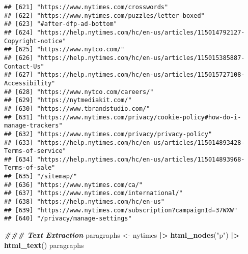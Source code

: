 \documentclass[
]{article}
\newenvironment{Shaded}{\begin{snugshade}}{\end{snugshade}}
\newcommand{\DocumentationTok}[1]{\textcolor[rgb]{0.56,0.35,0.01}{\textbf{\textit{#1}}}}
\newcommand{\FunctionTok}[1]{\textcolor[rgb]{0.13,0.29,0.53}{\textbf{#1}}}
\newcommand{\NormalTok}[1]{#1}
\newcommand{\OtherTok}[1]{\textcolor[rgb]{0.56,0.35,0.01}{#1}}
\newcommand{\SpecialCharTok}[1]{\textcolor[rgb]{0.81,0.36,0.00}{\textbf{#1}}}
\newcommand{\StringTok}[1]{\textcolor[rgb]{0.31,0.60,0.02}{#1}}
\begin{document}
\begin{verbatim}
## [621] "https://www.nytimes.com/crosswords"                                                                        
## [622] "https://www.nytimes.com/puzzles/letter-boxed"                                                              
## [623] "#after-dfp-ad-bottom"                                                                                      
## [624] "https://help.nytimes.com/hc/en-us/articles/115014792127-Copyright-notice"                                  
## [625] "https://www.nytco.com/"                                                                                    
## [626] "https://help.nytimes.com/hc/en-us/articles/115015385887-Contact-Us"                                        
## [627] "https://help.nytimes.com/hc/en-us/articles/115015727108-Accessibility"                                     
## [628] "https://www.nytco.com/careers/"                                                                            
## [629] "https://nytmediakit.com/"                                                                                  
## [630] "https://www.tbrandstudio.com/"                                                                             
## [631] "https://www.nytimes.com/privacy/cookie-policy#how-do-i-manage-trackers"                                    
## [632] "https://www.nytimes.com/privacy/privacy-policy"                                                            
## [633] "https://help.nytimes.com/hc/en-us/articles/115014893428-Terms-of-service"                                  
## [634] "https://help.nytimes.com/hc/en-us/articles/115014893968-Terms-of-sale"                                     
## [635] "/sitemap/"                                                                                                 
## [636] "https://www.nytimes.com/ca/"                                                                               
## [637] "https://www.nytimes.com/international/"                                                                    
## [638] "https://help.nytimes.com/hc/en-us"                                                                         
## [639] "https://www.nytimes.com/subscription?campaignId=37WXW"                                                     
## [640] "/privacy/manage-settings"
\end{verbatim}

\begin{Shaded}
\begin{Highlighting}[]
\DocumentationTok{\#\#\# Text Extraction}
\NormalTok{paragraphs }\OtherTok{\textless{}{-}}\NormalTok{ nytimes }\SpecialCharTok{|\textgreater{}} 
  \FunctionTok{html\_nodes}\NormalTok{(}\StringTok{"p"}\NormalTok{) }\SpecialCharTok{|\textgreater{}} 
  \FunctionTok{html\_text}\NormalTok{()}
\NormalTok{paragraphs}
\end{Highlighting}
\end{Shaded}
\end{document}
